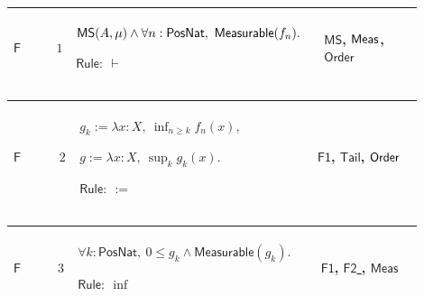 \documentclass[12pt,reqno]{amsart}
\theoremstyle{blueplain}
\numberwithin{equation}{section}
\begin{document}
{\scriptsize \setlength{\parskip}{0pt}\nointerlineskip
\noindent 
\begin{tabular}{|@{}>{\centering\arraybackslash}m{0.10658\linewidth}|>{\centering\arraybackslash}m{0.03553\linewidth}|>{\centering\arraybackslash}m{0.52105\linewidth}|>{\centering\arraybackslash}m{0.23684\linewidth}|}
\hline
\hypertarget{proof:F1}{$\displaystyle \mathsf{F}$} & $\displaystyle 1$ & $%
\displaystyle \mathsf{MS}(A,\mu)\land\forall n:\mathsf{PosNat},\ \mathsf{%
Measurable}(f_n).$\par$\displaystyle \mathsf{Rule}:\ \vdash$ & \hyperlink{def:MS}%
{$\displaystyle \mathsf{MS}$}, \hyperlink{def:Meas}{$\displaystyle \mathsf{%
Meas}$}, \hyperlink{ax:Order}{$\displaystyle \mathsf{Order}$} \\ \hline
\end{tabular}%
}

{\scriptsize \setlength{\parskip}{0pt}\nointerlineskip
\noindent 
\begin{tabular}{|@{}>{\centering\arraybackslash}m{0.10658\linewidth}|>{\centering\arraybackslash}m{0.03553\linewidth}|>{\centering\arraybackslash}m{0.52105\linewidth}|>{\centering\arraybackslash}m{0.23684\linewidth}|}
\hline
\hypertarget{proof:F2}{$\displaystyle \mathsf{F}$} & $\displaystyle 2$ & $%
\displaystyle g_k:=\lambda x:X,\ \inf_{n\ge k}f_n(x),$\par$\displaystyle %
g:=\lambda x:X,\ \sup_k g_k(x).$\par$\displaystyle \mathsf{Rule}:\ :=$ & 
\hyperlink{proof:F1}{$\displaystyle \mathsf{F1}$}, \hyperlink{def:Tail}{$%
\displaystyle \mathsf{Tail}$}, \hyperlink{ax:Order}{$\displaystyle \mathsf{%
Order}$} \\ \hline
\end{tabular}%
}

{\scriptsize \setlength{\parskip}{0pt}\nointerlineskip
\noindent 
\begin{tabular}{|@{}>{\centering\arraybackslash}m{0.10658\linewidth}|>{\centering\arraybackslash}m{0.03553\linewidth}|>{\centering\arraybackslash}m{0.52105\linewidth}|>{\centering\arraybackslash}m{0.23684\linewidth}|}
\hline
\hypertarget{proof:F3}{$\displaystyle \mathsf{F}$} & $\displaystyle 3$ & $%
\displaystyle \forall k:\mathsf{PosNat},\ 0\le g_k\land\mathsf{Measurable}%
(g_k).$\par$\displaystyle \mathsf{Rule}:\ \inf$ & \hyperlink{proof:F1}{$%
\displaystyle \mathsf{F1}$}, \hyperlink{proof:F2}{$\displaystyle \mathsf{F2}$%
}, \hyperlink{lem:Meas}{$\displaystyle \mathsf{Meas}$} \\ \hline
\end{tabular}%
}
\end{document}
